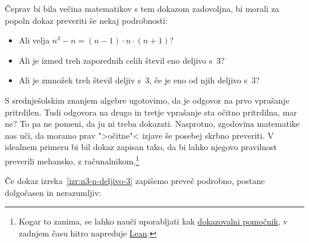 \noindent
Čeprav bi bila
večina matematikov s tem dokazom zadovoljna, bi morali za popoln dokaz
preveriti še nekaj podrobnosti:
%
\begin{itemize}
\item Ali velja $n^3 - n = (n-1) \cdot n \cdot (n+1)$?
\item Ali je izmed treh zaporednih celih števil eno deljivo s~$3$?
\item Ali je zmnožek treh števil deljiv s~$3$, če je eno od njih deljivo s~$3$?
\end{itemize}
%
S srednješolskim znanjem algebre ugotovimo, da je odgovor na prvo
vprašanje pritrdilen. Tudi odgovora na drugo in tretje vprašanje sta
očitno pritrdilna, mar ne? To pa ne pomeni, da ju ni treba dokazati.
Nasprotno, zgodovina matematike nas uči, da moramo prav ">očitne"<
izjave še posebej skrbno preveriti.
%
V idealnem primeru bi bil dokaz zapisan tako, da bi lahko njegovo pravilnost preverili mehansko, z
računalnikom.\footnote{Kogar to zanima, se lahko nauči uporabljati kak \href{https://ncatlab.org/nlab/show/proof+assistant}{dokazovalni pomočnik}, v zadnjem času hitro napreduje \href{https://lean-lang.org}{Lean}.}

Če dokaz izreka~\ref{izr:n3-n-deljivo-3} zapišemo preveč
podrobno, postane dolgočasen in ne\-ra\-zumljiv:

